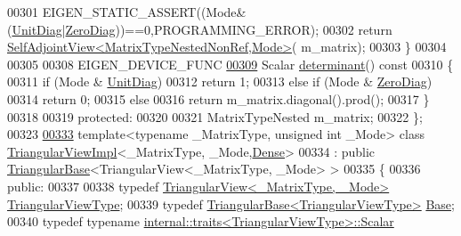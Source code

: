 \begin{DoxyCode}
00301       EIGEN\_STATIC\_ASSERT((Mode&(\hyperlink{group__enums_gga39e3366ff5554d731e7dc8bb642f83cdaddb72f888ac85d5a1c52333e54f9374b}{UnitDiag}|\hyperlink{group__enums_gga39e3366ff5554d731e7dc8bb642f83cda884ff7240392e85aa6e4b3c957e36483}{ZeroDiag}))==0,PROGRAMMING\_ERROR);
00302       \textcolor{keywordflow}{return} \hyperlink{group___core___module_class_eigen_1_1_self_adjoint_view}{SelfAdjointView<MatrixTypeNestedNonRef,Mode>}(
      m\_matrix);
00303     \}
00304 
00305 
00308     EIGEN\_DEVICE\_FUNC
\hyperlink{group___core___module_a39806fdec7a2a1a869e904c31ee8c67c}{00309}     Scalar \hyperlink{group___core___module_a39806fdec7a2a1a869e904c31ee8c67c}{determinant}()\textcolor{keyword}{ const}
00310 \textcolor{keyword}{    }\{
00311       \textcolor{keywordflow}{if} (Mode & \hyperlink{group__enums_gga39e3366ff5554d731e7dc8bb642f83cdaddb72f888ac85d5a1c52333e54f9374b}{UnitDiag})
00312         \textcolor{keywordflow}{return} 1;
00313       \textcolor{keywordflow}{else} \textcolor{keywordflow}{if} (Mode & \hyperlink{group__enums_gga39e3366ff5554d731e7dc8bb642f83cda884ff7240392e85aa6e4b3c957e36483}{ZeroDiag})
00314         \textcolor{keywordflow}{return} 0;
00315       \textcolor{keywordflow}{else}
00316         \textcolor{keywordflow}{return} m\_matrix.diagonal().prod();
00317     \}
00318       
00319   \textcolor{keyword}{protected}:
00320 
00321     MatrixTypeNested m\_matrix;
00322 \};
00323 
\hyperlink{group___core___module}{00333} \textcolor{keyword}{template}<\textcolor{keyword}{typename} \_MatrixType, \textcolor{keywordtype}{unsigned} \textcolor{keywordtype}{int} \_Mode> \textcolor{keyword}{class }\hyperlink{class_eigen_1_1_triangular_view_impl}{TriangularViewImpl}<\_MatrixType,
      \_Mode,\hyperlink{struct_eigen_1_1_dense}{Dense}>
00334   : \textcolor{keyword}{public} \hyperlink{group___core___module_class_eigen_1_1_triangular_base}{TriangularBase}<TriangularView<\_MatrixType, \_Mode> >
00335 \{
00336   \textcolor{keyword}{public}:
00337 
00338     \textcolor{keyword}{typedef} \hyperlink{group___core___module_class_eigen_1_1_triangular_view}{TriangularView<\_MatrixType, \_Mode>} 
      \hyperlink{group___core___module_class_eigen_1_1_triangular_view}{TriangularViewType};
00339     \textcolor{keyword}{typedef} \hyperlink{group___core___module_class_eigen_1_1_triangular_base}{TriangularBase<TriangularViewType>} 
      \hyperlink{group___core___module_class_eigen_1_1_triangular_base}{Base};
00340     \textcolor{keyword}{typedef} \textcolor{keyword}{typename} \hyperlink{struct_eigen_1_1internal_1_1traits}{internal::traits<TriangularViewType>::Scalar}

\end{DoxyCode}
